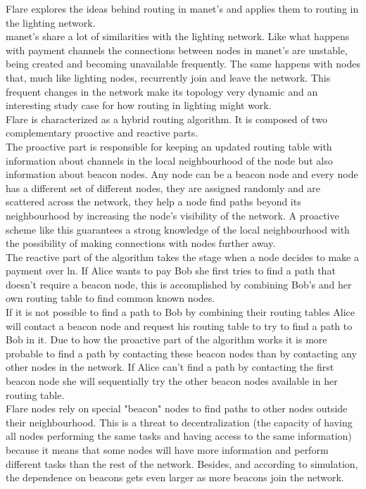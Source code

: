 Flare \cite{flare} explores the ideas behind routing in \acrfull{manet}'s and applies them to routing in the lighting network.\\
\acrshort{manet}'s share a lot of similarities with the lighting network. Like what happens with payment channels the connections between nodes in \acrshort{manet}'s are unstable, being created and becoming unavailable frequently. The same happens with nodes that, much like lighting nodes, recurrently join and leave the network. This frequent changes in the network make its topology very dynamic and an interesting study case for how routing in lighting might work. \\
Flare is characterized as a hybrid routing algorithm. It is composed of two complementary proactive and reactive parts.\\
The proactive part is responsible for keeping an updated routing table with information about channels in the local neighbourhood of the node but also information about beacon nodes. Any node can be a beacon node and every node has a different set of different nodes, they are assigned randomly and are scattered across the network, they help a node find paths beyond its neighbourhood by increasing the node's visibility of the network. A proactive scheme like this guarantees a strong knowledge of the local neighbourhood with the possibility of making connections with nodes further away. \\ 
The reactive part of the algorithm takes the stage when a node decides to make a payment over \acrshort{ln}. If Alice wants to pay Bob she first tries to find a path that doesn't require a beacon node, this is accomplished by combining Bob's and her own routing table to find common known nodes. \\
If it is not possible to find a path to Bob by combining their routing tables Alice will contact a beacon node and request his routing table to try to find a path to Bob in it. Due to how the proactive part of the algorithm works it is more probable to find a path by contacting these beacon nodes than by contacting any other nodes in the network. If Alice can't find a path by contacting the first beacon node she will sequentially try the other beacon nodes available in her routing table.\\
Flare nodes rely on special "beacon" nodes to find paths to other nodes outside their neighbourhood. This is a threat to decentralization (the capacity of having all nodes performing the same tasks and having access to the same information) because it means that some nodes will have more information and perform different tasks than the rest of the network. Besides, and according to simulation, the dependence on beacons gets even larger as more beacons join the network. \\
